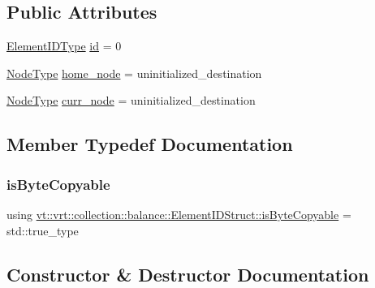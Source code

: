 \subsection*{Public Attributes}
\begin{DoxyCompactItemize}
\item 
\hyperlink{namespacevt_1_1vrt_1_1collection_1_1balance_a14c8d2c972f2913aa3f1636e5be0a120}{Element\+I\+D\+Type} \hyperlink{structvt_1_1vrt_1_1collection_1_1balance_1_1_element_i_d_struct_a3acb6937689a2fa83dbaac464fee4c54}{id} = 0
\item 
\hyperlink{namespacevt_a866da9d0efc19c0a1ce79e9e492f47e2}{Node\+Type} \hyperlink{structvt_1_1vrt_1_1collection_1_1balance_1_1_element_i_d_struct_ae2615194ecf0f255aff8a38d3d48dd82}{home\+\_\+node} = uninitialized\+\_\+destination
\item 
\hyperlink{namespacevt_a866da9d0efc19c0a1ce79e9e492f47e2}{Node\+Type} \hyperlink{structvt_1_1vrt_1_1collection_1_1balance_1_1_element_i_d_struct_aa51469e2067175092e7d02ef8b3226ac}{curr\+\_\+node} = uninitialized\+\_\+destination
\end{DoxyCompactItemize}


\subsection{Member Typedef Documentation}
\mbox{\label{structvt_1_1vrt_1_1collection_1_1balance_1_1_element_i_d_struct_a4a5e2778f19d4b5865c45c5fa2aef344}} 
\subsubsection{\texorpdfstring{is\+Byte\+Copyable}{isByteCopyable}}
{\footnotesize\ttfamily using \hyperlink{structvt_1_1vrt_1_1collection_1_1balance_1_1_element_i_d_struct_a4a5e2778f19d4b5865c45c5fa2aef344}{vt\+::vrt\+::collection\+::balance\+::\+Element\+I\+D\+Struct\+::is\+Byte\+Copyable} =  std\+::true\+\_\+type}



\subsection{Constructor \& Destructor Documentation}
\mbox{\label{structvt_1_1vrt_1_1collection_1_1balance_1_1_element_i_d_struct_ada8549d8bd0ab853da3d411d21af0df9}} 
